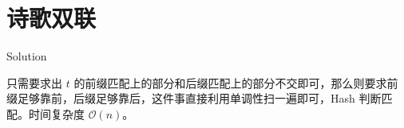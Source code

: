 \section{诗歌双联}

\begin{frame}{Solution}

只需要求出 $t$ 的前缀匹配上的部分和后缀匹配上的部分不交即可，那么则要求前缀足够靠前，后缀足够靠后，这件事直接利用单调性扫一遍即可，Hash 判断匹配。时间复杂度 $\mathcal O(n)$。

\end{frame}
